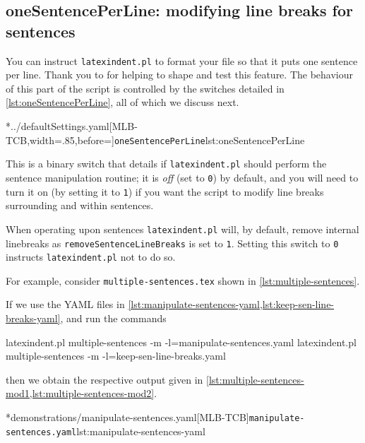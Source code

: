 \subsection{oneSentencePerLine: modifying line breaks for sentences}\label{sec:onesentenceperline}
	You can instruct \texttt{latexindent.pl} to format%
	 your file so that it puts one sentence
	per line. Thank you to \cite{mlep} for helping to shape and test this feature. The behaviour of this part of the script is controlled by the switches detailed in \cref{lst:oneSentencePerLine},
	all of which we discuss next.

	\cmhlistingsfromfile[style=oneSentencePerLine]*{../defaultSettings.yaml}[MLB-TCB,width=.85\linewidth,before=\centering]{\texttt{oneSentencePerLine}}{lst:oneSentencePerLine}

	This is a binary switch that details if \texttt{latexindent.pl} should perform the sentence manipulation routine; it
	is \emph{off} (set to \texttt{0}) by default, and you will need to turn it on (by setting it to \texttt{1}) if you want the script
	to modify line breaks surrounding and within sentences.

	When operating upon sentences \texttt{latexindent.pl} will, by default, remove internal linebreaks as \texttt{removeSentenceLineBreaks}
	is set to \texttt{1}. Setting this switch to \texttt{0} instructs \texttt{latexindent.pl} not to do so.

	For example, consider \texttt{multiple-sentences.tex} shown in \cref{lst:multiple-sentences}.


	If we use the YAML files in \cref{lst:manipulate-sentences-yaml,lst:keep-sen-line-breaks-yaml}, and run the commands
	\begin{widepage}
		\begin{commandshell}
latexindent.pl multiple-sentences -m -l=manipulate-sentences.yaml
latexindent.pl multiple-sentences -m -l=keep-sen-line-breaks.yaml
	\end{commandshell}
	\end{widepage}
	then we obtain the respective output given in \cref{lst:multiple-sentences-mod1,lst:multiple-sentences-mod2}.

	\begin{minipage}{.5\linewidth}
	\end{minipage}
	\hfill
	\begin{minipage}{.5\linewidth}
		\cmhlistingsfromfile[style=yaml-LST]*{demonstrations/manipulate-sentences.yaml}[MLB-TCB]{\texttt{manipulate-sentences.yaml}}{lst:manipulate-sentences-yaml}
	\end{minipage}

